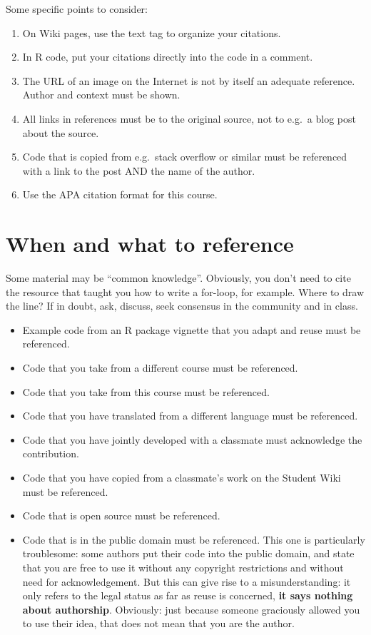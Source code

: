 \documentclass[]{book}
\providecommand{\tightlist}{%
  \setlength{\itemsep}{0pt}\setlength{\parskip}{0pt}}
\begin{document}
Some specific points to consider:

\begin{enumerate}
\def\labelenumi{\arabic{enumi}.}
\tightlist
\item
  On Wiki pages, use the text tag to organize your citations.
\item
  In R code, put your citations directly into the code in a comment.
\item
  The URL of an image on the Internet is not by itself an adequate
  reference. Author and context must be shown.
\item
  All links in references must be to the original source, not to e.g.~a
  blog post about the source.
\item
  Code that is copied from e.g.~stack overflow or similar must be
  referenced with a link to the post AND the name of the author.
\item
  Use the APA citation format for this course.
\end{enumerate}

\section{When and what to reference}\label{when-and-what-to-reference}

Some material may be ``common knowledge''. Obviously, you don't need to
cite the resource that taught you how to write a for-loop, for example.
Where to draw the line? If in doubt, ask, discuss, seek consensus in the
community and in class.

\begin{itemize}
\tightlist
\item
  Example code from an R package vignette that you adapt and reuse must
  be referenced.
\item
  Code that you take from a different course must be referenced.
\item
  Code that you take from this course must be referenced.
\item
  Code that you have translated from a different language must be
  referenced.
\item
  Code that you have jointly developed with a classmate must acknowledge
  the contribution.
\item
  Code that you have copied from a classmate's work on the Student Wiki
  must be referenced.
\item
  Code that is open source must be referenced.
\item
  Code that is in the public domain must be referenced. This one is
  particularly troublesome: some authors put their code into the public
  domain, and state that you are free to use it without any copyright
  restrictions and without need for acknowledgement. But this can give
  rise to a misunderstanding: it only refers to the legal status as far
  as reuse is concerned, \textbf{it says nothing about authorship}.
  Obviously: just because someone graciously allowed you to use their
  idea, that does not mean that you are the author.
\end{itemize}
\end{document}
